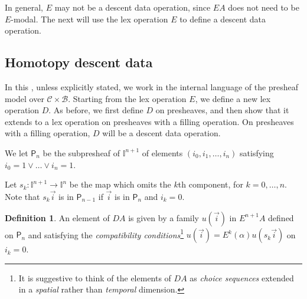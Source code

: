 \documentclass[10pt,a4paper,draft]{article}
\newcommand{\II}{\mathbb{I}}
\newcommand{\CC}{{\mathcal C}}
\newcommand{\diag}{\mathsf{diag}}
\newcommand{\BB}{\mathcal{B}}
\newcommand{\D}{D}              %
\newcommand{\E}{E}
\renewcommand{\~}{\widetilde}
\newcommand{\PP}{\mathsf{P}}
\newcommand{\cofuniv}{\Phi}
\theoremstyle{definition}
\newtheorem{definition}[theorem]{Definition}
\theoremstyle{remark} %
\begin{document}
In general, $\E$ may not be a descent data operation, since $\E A$ does not need to be $\E$\hyp{}modal.
The next  will use the lex operation $\E$ to define a descent data operation.

\subsection{Homotopy descent data}
\label{sec:homotopy-descent-data}

In this , unless explicitly stated,
we work in the internal language of the presheaf model over $\CC\times\BB$.
Starting from the lex operation $\E$, we define a new lex operation
$\D$.
As before, we first define $\D$ on presheaves, and then show that it extends
to a lex operation on presheaves with a filling operation.
On presheaves with a filling operation,
$\D$ will be  a descent data operation.

We let $\PP_n$ be the subpresheaf
of $\II^{n+1}$ of elements $(i_0,i_1,\dots,i_n)$ satisfying $i_0=1\vee\dots\vee i_n=1$.

\medskip

Let $s_k:\II^{n+1}\rightarrow \II^n$ be the map which omits the $k$th component,
for $k = 0,\dots, n$. Note that $s_k\vec{i}$ is in $\PP_{n-1}$
if $\vec{i}$ is in $\PP_n$ and $i_k=0$.


\begin{definition}
  An element of $\D A$ is given by a family %
  $u(\vec{i})$ in $\E^{n+1}A$ defined on $\PP_n$
  and satisfying the {\em compatibility conditions}\footnote{It is suggestive to think of the elements
    of $\D A$ as {\em choice sequences} \cite{TroelstraD88b} extended in a {\em spatial} rather than
    {\em temporal} dimension.}
$u(\vec{i}) = \E^k(\alpha) u(s_k\vec{i})$ on $i_k=0$.
\end{definition}
\end{document}
